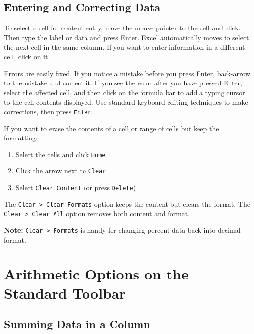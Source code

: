\documentclass[
]{book}
\providecommand{\tightlist}{%
  \setlength{\itemsep}{0pt}\setlength{\parskip}{0pt}}
\begin{document}
\hypertarget{entering-and-correcting-data}{%
\subsection{Entering and Correcting Data}\label{entering-and-correcting-data}}

To select a cell for content entry, move the mouse pointer to the cell and click. Then type the label or data and press Enter. Excel automatically moves to select the next cell in the same column. If you want to enter information in a different cell, click on it.

Errors are easily fixed. If you notice a mistake before you press Enter, back-arrow to the mistake and correct it. If you see the error after you have pressed Enter, select the affected cell, and then click on the formula bar to add a typing cursor to the cell contents displayed. Use standard keyboard editing techniques to make corrections, then press \texttt{Enter}.

If you want to erase the contents of a cell or range of cells but keep the formatting:

\begin{enumerate}
\def\labelenumi{\arabic{enumi}.}
\tightlist
\item
  Select the cells and click \texttt{Home}
\item
  Click the arrow next to \texttt{Clear}
\item
  Select \texttt{Clear\ Content} (or press \texttt{Delete})
\end{enumerate}

The \texttt{Clear\ \textgreater{}\ Clear\ Formats} option keeps the content but clears the format. The \texttt{Clear\ \textgreater{}\ Clear\ All} option removes both content and format.

\textbf{Note:} \texttt{Clear\ \textgreater{}\ Formats} is handy for changing percent data back into decimal format.

\hypertarget{arithmetic-options-on-the-standard-toolbar}{%
\section{Arithmetic Options on the Standard Toolbar}\label{arithmetic-options-on-the-standard-toolbar}}

\hypertarget{summing-data-in-a-column}{%
\subsection{Summing Data in a Column}\label{summing-data-in-a-column}}
\end{document}
